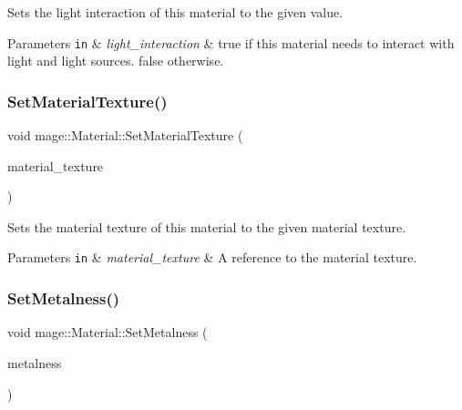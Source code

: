 Sets the light interaction of this material to the given value.


\begin{DoxyParams}[1]{Parameters}
\mbox{\tt in}  & {\em light\+\_\+interaction} & {\ttfamily true} if this material needs to interact with light and light sources. {\ttfamily false} otherwise. \\
\hline
\end{DoxyParams}
\hypertarget{structmage_1_1_material_a8f88eda4c45268bf6a30878948055ff5}{}\label{structmage_1_1_material_a8f88eda4c45268bf6a30878948055ff5} 
\subsubsection{\texorpdfstring{Set\+Material\+Texture()}{SetMaterialTexture()}}
{\footnotesize\ttfamily void mage\+::\+Material\+::\+Set\+Material\+Texture (\begin{DoxyParamCaption}\item[{const \hyperlink{namespacemage_a1e01ae66713838a7a67d30e44c67703e}{Shared\+Ptr}$<$ const \hyperlink{classmage_1_1_texture}{Texture} $>$ \&}]{material\+\_\+texture }\end{DoxyParamCaption})}

Sets the material texture of this material to the given material texture.


\begin{DoxyParams}[1]{Parameters}
\mbox{\tt in}  & {\em material\+\_\+texture} & A reference to the material texture. \\
\hline
\end{DoxyParams}
\hypertarget{structmage_1_1_material_a70dde310b2108e9ad3041df13db0bdc0}{}\label{structmage_1_1_material_a70dde310b2108e9ad3041df13db0bdc0} 
\subsubsection{\texorpdfstring{Set\+Metalness()}{SetMetalness()}}
{\footnotesize\ttfamily void mage\+::\+Material\+::\+Set\+Metalness (\begin{DoxyParamCaption}\item[{\hyperlink{namespacemage_aa97e833b45f06d60a0a9c4fc22ae02c0}{F32}}]{metalness }\end{DoxyParamCaption})\hspace{0.3cm}{\ttfamily [noexcept]}}

